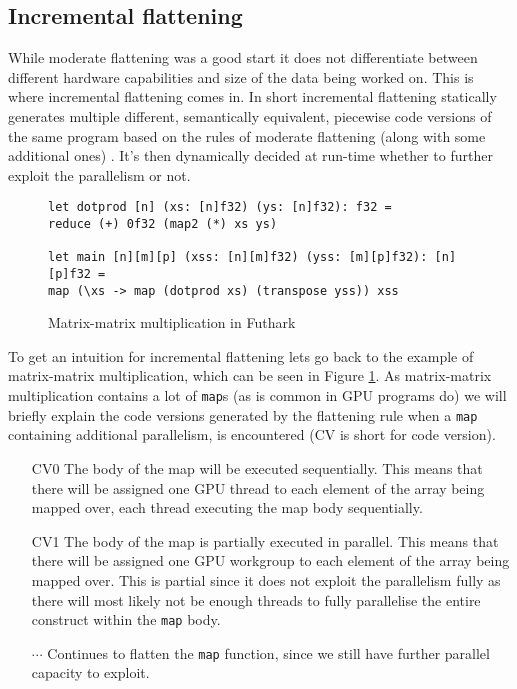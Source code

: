 \subsection{Incremental flattening}
While moderate flattening was a good start it does not differentiate between different
hardware capabilities and size of the data being worked on. This is where 
incremental flattening comes in. In short incremental flattening statically 
generates multiple different, semantically equivalent, piecewise code versions 
of the same program based on the rules of moderate flattening (along with some 
additional ones) \cite{inc-flat}. It's then dynamically decided at run-time 
whether to further exploit the parallelism or not.
\begin{figure}[h]
\centering
\lstset{language=haskell}
\begin{lstlisting}
let dotprod [n] (xs: [n]f32) (ys: [n]f32): f32 =
reduce (+) 0f32 (map2 (*) xs ys)

let main [n][m][p] (xss: [n][m]f32) (yss: [m][p]f32): [n][p]f32 =
map (\xs -> map (dotprod xs) (transpose yss)) xss
\end{lstlisting}%
\caption{Matrix-matrix multiplication in Futhark \cite{ppopp}}
\label{matmultFuthark}
\end{figure}
To get an intuition for incremental flattening lets go back to the example of
matrix-matrix multiplication, which can be seen in Figure \ref{matmultFuthark}.
As matrix-matrix multiplication contains a lot of \texttt{map}s (as is common 
in GPU programs do) we will briefly explain the code versions generated by the 
flattening rule when a \texttt{map} containing additional parallelism, is 
encountered (CV is short for code version).
\begin{itemize}
\item[CV0] The body of the map will be executed sequentially. This means that 
there will be assigned one GPU thread to each element of the array being mapped 
over, each thread executing the map body sequentially.
\item[CV1] The body of the map is partially executed in parallel. This means 
that there will be assigned one GPU workgroup to each element of the 
array being mapped over. This is partial since it does not exploit the 
parallelism fully as there will most likely not be enough threads to fully 
parallelise the entire construct within the \texttt{map} body.
\item[$\cdots$] Continues to flatten the \texttt{map} function, since we still 
have further parallel capacity to exploit.  \end{itemize}

